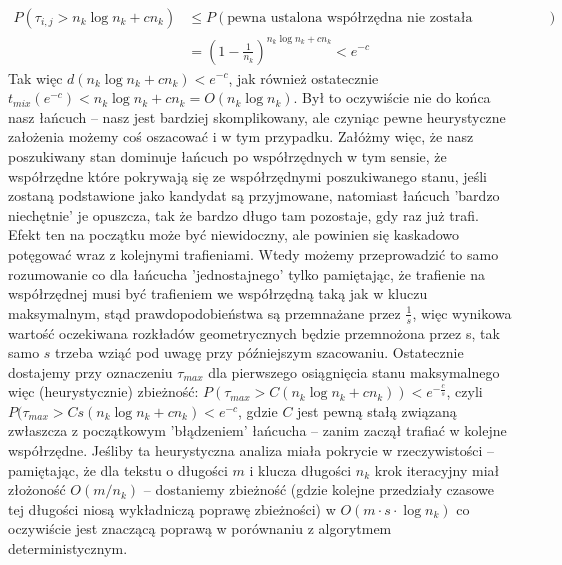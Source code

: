 \documentclass[a4paper]{article}
\begin{document}
\begin{align*}
    P(\tau_{i,j} > n_k \log n_k + cn_k) &\leq P(\text{pewna ustalona współrzędna nie została odwiedzona})\\
    &= (1-\frac{1}{n_k})^{n_k \log n_k + cn_k} < e^{-c}
\end{align*}
Tak więc $d(n_k \log n_k + cn_k) < e^{-c}$, jak również ostatecznie $t_{mix}(e^{-c}) < n_k \log n_k + cn_k = O(n_k \log n_k)$. Był to oczywiście nie do końca nasz łańcuch – nasz jest bardziej skomplikowany, ale czyniąc pewne heurystyczne założenia możemy coś oszacować i w tym przypadku. Załóżmy więc, że nasz poszukiwany stan dominuje łańcuch po współrzędnych w tym sensie, że współrzędne które pokrywają się ze współrzędnymi poszukiwanego stanu, jeśli zostaną podstawione jako kandydat są przyjmowane, natomiast łańcuch 'bardzo niechętnie' je opuszcza, tak że bardzo długo tam pozostaje, gdy raz już trafi. Efekt ten na początku może być niewidoczny, ale powinien się kaskadowo potęgować wraz z kolejnymi trafieniami. Wtedy możemy przeprowadzić to samo rozumowanie co dla łańcucha 'jednostajnego' tylko pamiętając, że trafienie na współrzędnej musi być trafieniem we współrzędną taką jak w kluczu maksymalnym, stąd prawdopodobieństwa są przemnażane przez $\frac{1}{s}$, więc wynikowa wartość oczekiwana rozkładów geometrycznych będzie przemnożona przez s, tak samo $s$ trzeba wziąć pod uwagę przy późniejszym szacowaniu. Ostatecznie dostajemy przy oznaczeniu $\tau_{max}$ dla pierwszego osiągnięcia stanu maksymalnego więc (heurystycznie) zbieżność:
$P(\tau_{max} > C(n_k \log n_k + cn_k)) < e^{-\frac{c}{s}}$, czyli
$P(\tau_{max} > Cs(n_k \log n_k + cn_k) < e^{-c}$, gdzie $C$ jest pewną stałą związaną zwłaszcza z początkowym 'błądzeniem' łańcucha – zanim zaczął trafiać w kolejne współrzędne. Jeśliby ta heurystyczna analiza miała pokrycie w rzeczywistości – pamiętając, że dla tekstu o długości $m$ i klucza długości $n_k$ krok iteracyjny miał złożoność $O(m/n_k)$ – dostaniemy zbieżność (gdzie kolejne przedziały czasowe tej długości niosą wykładniczą poprawę zbieżności) w $O(m \cdot s \cdot \log n_k)$ co oczywiście jest znaczącą poprawą w porównaniu z algorytmem deterministycznym.
\end{document}

